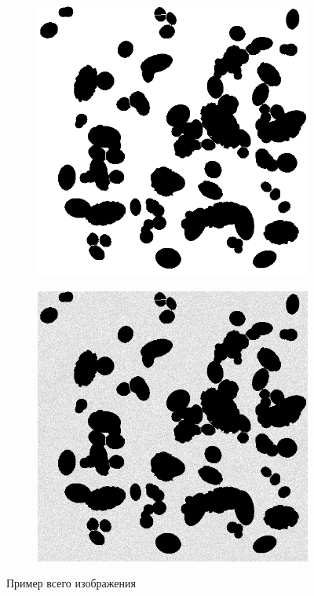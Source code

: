 \documentclass[code]{wordcore}
\begin{document}
\begin{figure}[H]
	\centering
	\begin{subfigure}[t]{0.48\textwidth}
		\includegraphics[width=\textwidth]{fig/full_clean.png}
	\end{subfigure}
	\hfill
	\begin{subfigure}[t]{0.48\textwidth}
		\includegraphics[width=\textwidth]{fig/full.png}
	\end{subfigure}
	\caption{Пример всего изображения}
\end{figure}
\end{document}
